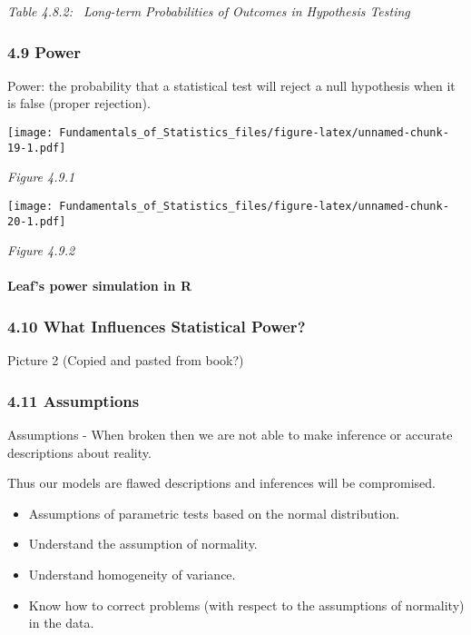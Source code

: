 \documentclass[]{article}
\providecommand{\tightlist}{%
  \setlength{\itemsep}{0pt}\setlength{\parskip}{0pt}}
\let\oldparagraph\paragraph
\renewcommand{\paragraph}[1]{\oldparagraph{#1}\mbox{}}
\begin{document}
\emph{Table 4.8.2: ~Long-term Probabilities of Outcomes in Hypothesis
Testing}

\hypertarget{power}{%
\subsubsection{4.9 Power}\label{power}}

Power: the probability that a statistical test will reject a null
hypothesis when it is false (proper rejection).

\texttt{[image: Fundamentals\_of\_Statistics\_files/figure-latex/unnamed-chunk-19-1.pdf]}

\emph{Figure 4.9.1}

\texttt{[image: Fundamentals\_of\_Statistics\_files/figure-latex/unnamed-chunk-20-1.pdf]}

\emph{Figure 4.9.2}

\hypertarget{leafs-power-simulation-in-r}{%
\paragraph{Leaf's power simulation in
R}\label{leafs-power-simulation-in-r}}

\hypertarget{what-influences-statistical-power}{%
\subsubsection{4.10 What Influences Statistical
Power?}\label{what-influences-statistical-power}}

Picture 2 (Copied and pasted from book?)

\hypertarget{assumptions}{%
\subsubsection{4.11 Assumptions}\label{assumptions}}

Assumptions - When broken then we are not able to make inference or
accurate descriptions about reality.

Thus our models are flawed descriptions and inferences will be
compromised.

\begin{itemize}
\tightlist
\item
  Assumptions of parametric tests based on the normal distribution.
\item
  Understand the assumption of normality.
\item
  Understand homogeneity of variance.
\item
  Know how to correct problems (with respect to the assumptions of
  normality) in the data.
\end{itemize}
\end{document}
